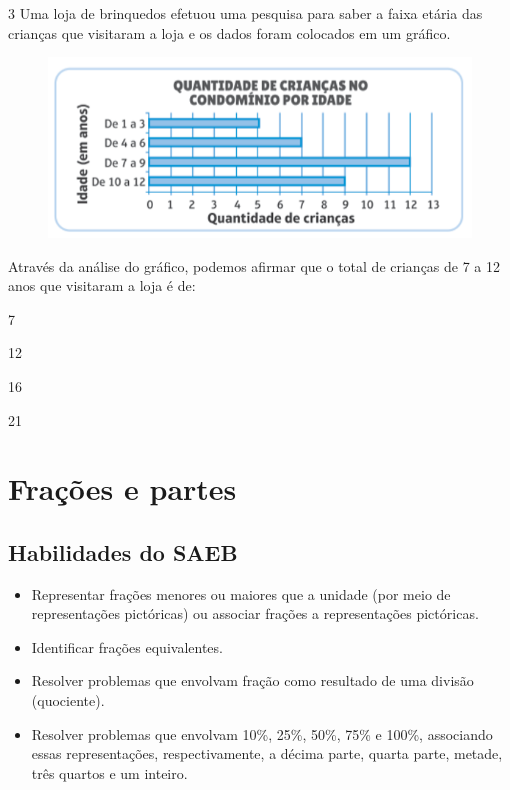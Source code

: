 \num{3} Uma loja de brinquedos efetuou uma pesquisa para
saber a faixa etária das crianças que visitaram a loja e os dados foram colocados em um gráfico.

\begin{figure}[htpb!]
\centering
\includegraphics[width=\textwidth]{./imgs/mat14.png}
\end{figure}

Através da análise do gráfico, podemos afirmar que o total de crianças de 7 a 12 anos que visitaram a loja é de:

\begin{minipage}{.5\textwidth}
\begin{escolha}
\item
  7
\item
  12
\item
  16
\item
  21
\end{escolha}
\end{minipage}


\chapter{Frações e partes}

\section*{Habilidades do SAEB}

\begin{itemize}
\item Representar frações menores ou maiores que a unidade (por meio de
representações pictóricas) ou associar frações a representações pictóricas.

\item Identificar frações equivalentes.

\item Resolver problemas que envolvam fração como resultado de uma divisão
(quociente).

\item Resolver problemas que envolvam 10\%, 25\%, 50\%, 75\% e 100\%,
associando essas representações, respectivamente, a décima parte, quarta parte, metade,
três quartos e um inteiro.
\end{itemize}

